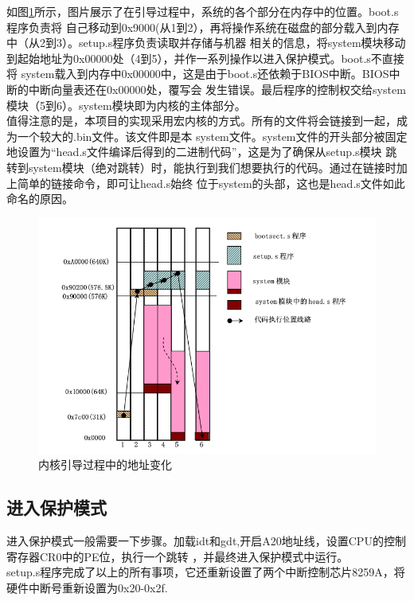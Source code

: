 \documentclass[a4paper]{article}
\begin{document}
    
    如图\ref{fig:boot_address}所示，图片展示了在引导过程中，系统的各个部分在内存中的位置。boot.s程序负责将
    自己移动到0x9000(从1到2），再将操作系统在磁盘的部分载入到内存中（从2到3）。setup.s程序负责读取并存储与机器
    相关的信息，将system模块移动到起始地址为0x00000处（4到5），并作一系列操作以进入保护模式。boot.s不直接将
    system载入到内存中0x00000中，这是由于boot.s还依赖于BIOS中断。BIOS中断的中断向量表还在0x00000处，覆写会
    发生错误。最后程序的控制权交给system模块（5到6）。system模块即为内核的主体部分。\\ 

    值得注意的是，本项目的实现采用宏内核的方式。所有的文件将会链接到一起，成为一个较大的.bin文件。该文件即是本
    system文件。system文件的开头部分被固定地设置为``head.s文件编译后得到的二进制代码''，这是为了确保从setup.s模块
    跳转到system模块（绝对跳转）时，能执行到我们想要执行的代码。通过在链接时加上简单的链接命令，即可让head.s始终
    位于system的头部，这也是head.s文件如此命名的原因。
    \begin{figure}
        \begin{center}
        \includegraphics[scale=0.6]{assets/boot_address.png}
        \caption{内核引导过程中的地址变化\label{fig:boot_address}} 
        \end{center} 
    \end{figure} 
    

    \subsection{进入保护模式}\label{sec:pm}
        进入保护模式一般需要一下步骤。加载idt和gdt,开启A20地址线，设置CPU的控制寄存器CR0中的PE位，执行一个跳转
        ，并最终进入保护模式中运行。\\ 
        setup.s程序完成了以上的所有事项，它还重新设置了两个中断控制芯片8259A，将硬件中断号重新设置为0x20-0x2f.\\ 
\end{document}
